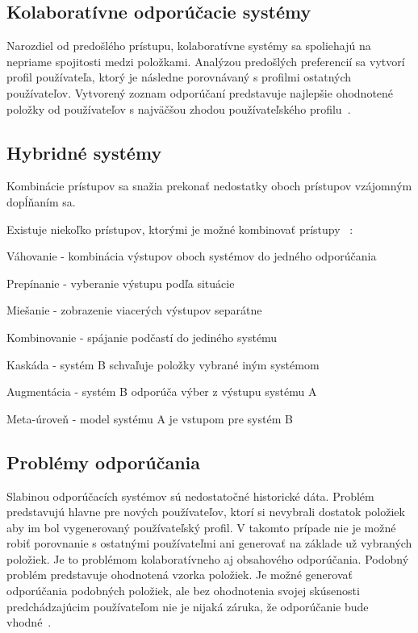 \subsection{Kolaboratívne odporúčacie systémy}
\label{collaboration_based_recommenders}

Narozdiel od predošlého prístupu, kolaboratívne systémy sa spoliehajú na nepriame spojitosti medzi položkami. Analýzou predošlých preferencií sa vytvorí profil používateľa, ktorý je následne porovnávaný s profilmi ostatných používateľov. Vytvorený zoznam odporúčaní predstavuje najlepšie ohodnotené položky od používateľov s najväčšou zhodou používateľského profilu~\cite{adomavicius2005toward}.

\subsection{Hybridné systémy}
\label{hybrid_recommenders}

Kombinácie prístupov sa snažia prekonať nedostatky oboch prístupov vzájomným dopĺňaním sa. 

Existuje niekoľko prístupov, ktorými je možné kombinovať prístupy ~\cite{burke2002hybrid}:

\begin{my_itemize}
	\item{Váhovanie} - kombinácia výstupov oboch systémov do jedného odporúčania
	\item{Prepínanie} - vyberanie výstupu podľa situácie
	\item{Miešanie} - zobrazenie viacerých výstupov separátne
	\item{Kombinovanie} - spájanie podčastí do jediného systému
	\item{Kaskáda} - systém B schvaľuje položky vybrané iným systémom
	\item{Augmentácia} - systém B odporúča výber z výstupu systému A
	\item{Meta-úroveň} - model systému A je vstupom pre systém B
\end{my_itemize}

\subsection{Problémy odporúčania}
\label{recommender_problems}

Slabinou odporúčacích systémov sú nedostatočné historické dáta. Problém predstavujú hlavne pre nových používateľov, ktorí si nevybrali dostatok položiek aby im bol vygenerovaný používateľský profil. V takomto prípade nie je možné robiť porovnanie s ostatnými používateľmi ani generovať na základe už vybraných položiek. Je to problémom kolaboratívneho aj obsahového odporúčania. Podobný problém predstavuje ohodnotená vzorka položiek. Je možné generovať odporúčania podobných položiek, ale bez ohodnotenia svojej skúsenosti predchádzajúcim používateľom nie je nijaká záruka, že odporúčanie bude vhodné~\cite{adomavicius2005toward}.


